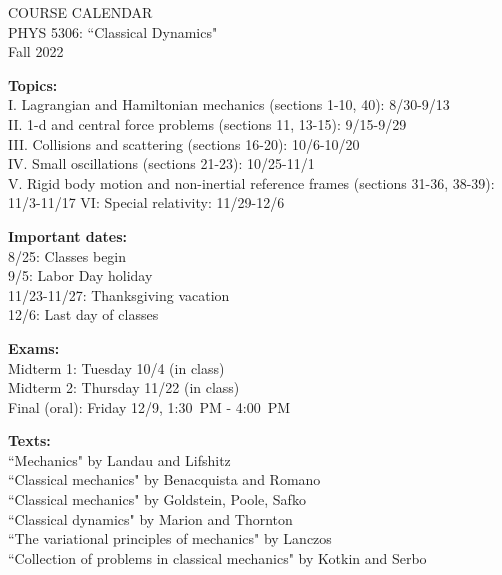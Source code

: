 \documentclass[11pt]{NSF}
\begin{document}
\begin{center}
COURSE CALENDAR\\
PHYS 5306: ``Classical Dynamics"\\
Fall 2022\\
\end{center}

{\bf Topics:}\\
I. Lagrangian and Hamiltonian mechanics (sections 1-10,  40):
8/30-9/13\\
II. 1-d and central force problems (sections 11, 13-15): 9/15-9/29\\
III. Collisions and scattering (sections 16-20): 10/6-10/20\\
IV. Small oscillations (sections 21-23): 10/25-11/1\\
V. Rigid body motion and non-inertial reference frames (sections
31-36, 38-39): 11/3-11/17
VI: Special relativity: 11/29-12/6

{\bf Important dates:}\\
8/25: Classes begin\\
9/5: Labor Day holiday\\
11/23-11/27: Thanksgiving vacation\\
12/6: Last day of classes

{\bf Exams:}\\
Midterm 1: Tuesday 10/4 (in class)\\
Midterm 2: Thursday 11/22 (in class)\\
Final (oral): Friday 12/9, 1:30~PM - 4:00~PM

{\bf Texts:}\\
``Mechanics" by Landau and Lifshitz\\
``Classical mechanics" by Benacquista and Romano\\
``Classical mechanics" by Goldstein, Poole, Safko\\
``Classical dynamics" by Marion and Thornton\\
``The variational principles of mechanics" by Lanczos\\
``Collection of problems in classical mechanics" by Kotkin and Serbo\\
\end{document}
